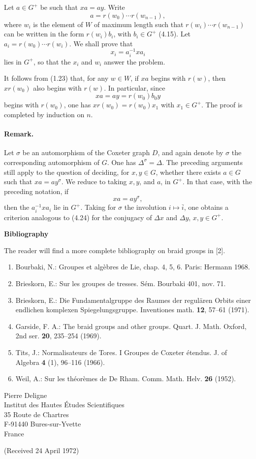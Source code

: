 \documentclass[10pt]{article}
\begin{document}
Let \(a\in G^+\) be such that \(xa=ay\). Write
\[
a=r(w_0)\cdots r(w_{n-1}),
\]
where \(w_i\) is the element of \(W\) of maximum length such that \(r(w_i)\cdots r(w_{n-1})\) can be written in the form \(r(w_i)b_i\), with \(b_i\in G^+\) (4.15). Let \(a_i=r(w_0)\cdots r(w_i)\). We shall prove that
\[
x_i=a_i^{-1}xa_i
\]
lies in \(G^+\), so that the \(x_i\) and \(w_i\) answer the problem.

It follows from (1.23) that, for any \(w\in W\), if \(xa\) begins with \(r(w)\), then \(xr(w_0)\) also begins with \(r(w)\). In particular, since
\[
xa=ay=r(w_0)b_0y
\]
begins with \(r(w_0)\), one has \(xr(w_0)=r(w_0)x_1\) with \(x_1\in G^+\). The proof is completed by induction on \(n\).

\paragraph{Remark.} Let \(\sigma\) be an automorphism of the Coxeter graph \(D\), and again denote by \(\sigma\) the corresponding automorphism of \(G\). One has \(\Delta^\sigma=\Delta\). The preceding arguments still apply to the question of deciding, for \(x,y\in G\), whether there exists \(a\in G\) such that \(xa=ay^\sigma\). We reduce to taking \(x,y\), and \(a\), in \(G^+\). In that case, with the preceding notation, if
\[
xa=ay^\sigma,
\]
then the \(a_i^{-1}xa_i\) lie in \(G^+\). Taking for \(\sigma\) the involution \(i\mapsto\bar i\), one obtains a criterion analogous to (4.24) for the conjugacy of \(\Delta x\) and \(\Delta y\), \(x,y\in G^+\).

\begin{center}
\bfseries Bibliography
\end{center}
The reader will find a more complete bibliography on braid groups in [2].
\begin{enumerate}[label=\arabic*.]
\item Bourbaki, N.: Groupes et algèbres de Lie, chap. 4, 5, 6. Paris: Hermann 1968.
\item Brieskorn, E.: Sur les groupes de tresses. Sém. Bourbaki 401, nov. 71.
\item Brieskorn, E.: Die Fundamentalgruppe des Raumes der regulären Orbits einer endlichen komplexen Spiegelungsgruppe. Inventiones math. \textbf{12}, 57--61 (1971).
\item Garside, F. A.: The braid groups and other groups. Quart. J. Math. Oxford, 2nd ser. \textbf{20}, 235--254 (1969).
\item Tits, J.: Normalisateurs de Tores. I Groupes de Coxeter étendus. J. of Algebra \textbf{4} (1), 96--116 (1966).
\item Weil, A.: Sur les théorèmes de De Rham. Comm. Math. Helv. \textbf{26} (1952).
\end{enumerate}

\begin{flushright}
Pierre Deligne\\
Institut des Hautes Études Scientifiques\\
35 Route de Chartres\\
F-91440 Bures-sur-Yvette\\
France
\end{flushright}

\begin{center}
(Received 24 April 1972)
\end{center}
\end{document}
